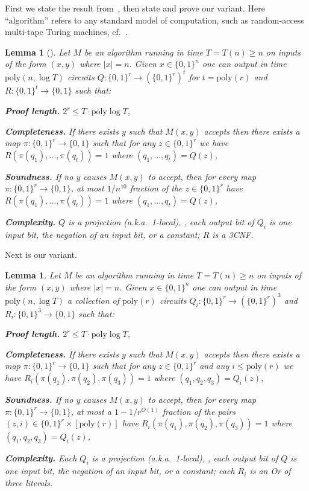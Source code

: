 \documentclass{toc}
\newtheorem{lem}[theorem]{Lemma}  %
\newcommand{\zo}{\{0, 1\}}
\newcommand{\poly}{\mathrm{poly}}
\begin{document}
First we state the result from~\cite{Ben-SassonV-AC0PCP}, then state
and prove our variant. Here ``algorithm'' refers to any standard
model of computation, such as random-access multi-tape Turing machines,
cf.~\cite{Williams14-acc-jacm}.
\begin{lem}[{\cite{Ben-SassonV-AC0PCP}}] \label{lem:BV-PCP}Let $M$ be an algorithm
running in time $T=T(n)\geq n$ on inputs of the form $(x,y)$ where
$|x|=n$. Given $x\in\{0,1\}^{n}$ one can output in time $\poly(n,\log T)$
circuits $Q:\zo^{r}\to(\zo^{r})^{t}$ for $t=\poly(r)$ and $R:\zo^{t}\to\zo$
such that:

\textbf{Proof length.} $2^{r}\le T\cdot\poly\log T$,

\textbf{Completeness.} If there exists $y$ such that $M(x,y)$ accepts
then there exists a map $\pi:\zo^{r}\to\zo$ such that for any $z\in\zo^{r}$
we have $R(\pi(q_{1}),\ldots,\pi(q_{t}))=1$ where $(q_{1},\ldots,q_{t})=Q(z)$,

\textbf{Soundness.} If no $y$ causes $M(x,y)$ to accept, then for
every map $\pi:\zo^{r}\to\zo$, at most $1/n^{10}$ fraction of the
$z\in\zo^{r}$ have $R(\pi(q_{1}),\ldots,\pi(q_{t}))=1$ where $(q_{1},\ldots,q_{t})=Q(z)$,

\textbf{Complexity.} $Q$ is a projection (a.k.a.~1-local), \ie,
each output bit of $Q_{i}$ is one input bit, the negation of an input
bit, or a constant; $R$ is a 3CNF.
\end{lem}

Next is our variant.
\begin{lem}
\label{lem:NEW-PCP} Let $M$ be an algorithm running in time $T=T(n)\geq n$
on inputs of the form $(x,y)$ where $|x|=n$. Given $x\in\{0,1\}^{n}$
one can output in time $\poly(n,\log T)$ a collection of $\poly(r)$
circuits $Q_{i}:\zo^{r}\to(\zo^{r})^{3}$ and $R_{i}:\zo^{3}\to\zo$
such that:

\textbf{Proof length.} $2^{r}\le T\cdot\poly\log T$,

\textbf{Completeness.} If there exists $y$ such that $M(x,y)$ accepts
then there exists a map $\pi:\zo^{r}\to\zo$ such that for any $z\in\zo^{r}$
and any $i\le\poly(r)$ we have $R_{i}(\pi(q_{1}),\pi(q_{2}),\pi(q_{3}))=1$
where $(q_{1},q_{2},q_{3})=Q_{i}(z)$,

\textbf{Soundness.} If no $y$ causes $M(x,y)$ to accept, then for
every map $\pi:\zo^{r}\to\zo$, at most a $1-1/r^{O(1)}$ fraction
of the pairs $(z,i)\in\zo^{r}\times[\poly(r)]$ have $R_{i}(\pi(q_{1}),\pi(q_{2}),\pi(q_{3}))=1$
where $(q_{1},q_{2},q_{3})=Q_{i}(z)$,

\textbf{Complexity.} Each $Q_{i}$ is a projection (a.k.a.~1-local),
\ie, each output bit of $Q$ is one input bit, the negation of an
input bit, or a constant; each $R_{i}$ is an Or of three literals.
\end{lem}
\end{document}
